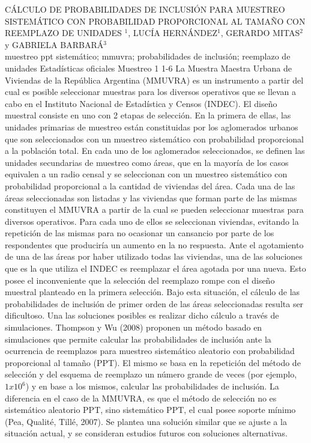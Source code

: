 \A
{CÁLCULO DE PROBABILIDADES DE INCLUSIÓN PARA MUESTREO SISTEMÁTICO CON PROBABILIDAD PROPORCIONAL AL TAMAÑO CON REEMPLAZO DE UNIDADES}
{$^1$, LUCÍA HERNÁNDEZ$^1$, GERARDO MITAS$^2$ y GABRIELA BARBARÁ$^3$}
{
\\}
{muestreo ppt sistemático; mmuvra; probabilidades de inclusión; reemplazo de unidades} 
 {Estadísticas oficiales} 
 {Muestreo} 
 {1} 
 {1-6}
{La Muestra Maestra Urbana de Viviendas de la República Argentina (MMUVRA) es un instrumento a partir del cual es posible seleccionar muestras para los diversos operativos que se llevan a cabo en el Instituto Nacional de Estadística y Censos (INDEC). El diseño muestral consiste en uno con 2 etapas de selección. En la primera de ellas, las unidades primarias de muestreo están constituidas por los aglomerados urbanos que son seleccionados con un muestreo sistemático con probabilidad proporcional a la población total. En cada uno de los aglomerados seleccionados, se definen las unidades secundarias de muestreo como áreas, que en la mayoría de los casos equivalen a un radio censal y se seleccionan con un muestreo sistemático con probabilidad proporcional a la cantidad de viviendas del área. Cada una de las áreas seleccionadas son listadas y las viviendas que forman parte de las mismas constituyen el MMUVRA a partir de la cual se pueden seleccionar muestras para diversos operativos. Para cada uno de ellos se seleccionan viviendas, evitando la repetición de las mismas para no ocasionar un cansancio por parte de los respondentes que produciría un aumento en la no respuesta. Ante el agotamiento de una de las áreas por haber utilizado todas las viviendas, una de las soluciones que es la que utiliza el INDEC es reemplazar el área agotada por una nueva. Esto posee el inconveniente que la selección del reemplazo rompe con el diseño muestral planteado en la primera selección. Bajo esta situación, el cálculo de las probabilidades de inclusión de primer orden de las áreas seleccionadas resulta ser dificultoso. Una las soluciones posibles es realizar dicho cálculo a través de simulaciones. Thompson y Wu (2008) proponen un método basado en simulaciones que permite calcular las probabilidades de inclusión ante la ocurrencia de reemplazos para muestreo sistemático aleatorio con probabilidad proporcional al tamaño (PPT). El mismo se basa en la repetición del método de selección y del esquema de reemplazo un número grande de veces (por ejemplo, $1x10^6$) y en base a los mismos, calcular las probabilidades de inclusión. La diferencia en el caso de la MMUVRA, es que el método de selección no es sistemático aleatorio PPT, sino sistemático PPT, el cual posee soporte mínimo (Pea, Qualité, Tillé, 2007). Se plantea una solución similar que se ajuste a la situación actual, y se consideran estudios futuros con soluciones alternativas.}
